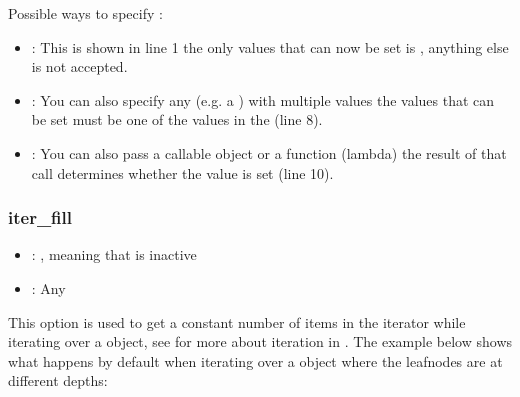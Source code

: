 \documentclass[a4paper,10pt,english]{sphinxmanual}
\begin{document}
\sphinxAtStartPar
Possible ways to specify :
\begin{itemize}
\item {}
\sphinxAtStartPar
{}: This is shown in line 1 \textendash{} the only values that can now be set is , anything else is not accepted.

\item {}
\sphinxAtStartPar
{}: You can also specify any  (e.g. a ) with multiple values \textendash{} the values that can be set must be one of the values in the  (line 8).

\item {}
\sphinxAtStartPar
{}: You can also pass a callable object or a function (lambda) \textendash{} the result of that call determines whether the value is set (line 10).

\end{itemize}


\subsubsection{iter\_fill}
\label{\detokenize{README:iter-fill}}\begin{itemize}
\item {}
\sphinxAtStartPar
{}: , meaning that  is inactive

\item {}
\sphinxAtStartPar
{}: Any

\end{itemize}

\sphinxAtStartPar
This option is used to get a constant number of items in the iterator while iterating over a \sphinxhyphen{}object, see {\hyperref[\detokenize{README:iterating-over-nested-objects}]{}} for more about iteration in . The example below shows what happens by default when iterating over a \sphinxhyphen{}object where the leaf\sphinxhyphen{}nodes are at different depths:
\end{document}
